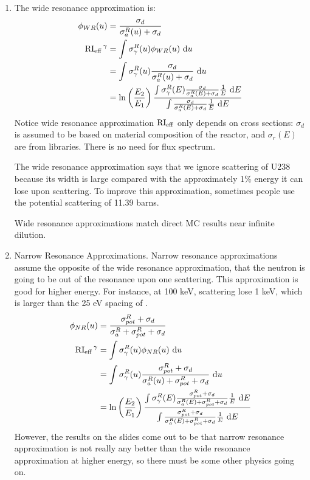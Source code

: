\documentclass{school-22.211-notes}
\date{February 27, 2012}
\begin{document}
\maketitle

\clearpage
{}
\begin{enumerate}
\item The wide resonance approximation is: 
\begin{align}
\phi_{WR} (u) &= \frac{\sigma_d}{\sigma_{a}^R (u) +  \sigma_d } \\
\left. \mathrm{RI}_{\mathrm{eff}} \right.^{\gamma} &= \int \sigma_{\gamma}^R (u) \phi_{WR} (u) \mbox{ }\mathrm{d} u \\
&= \int \sigma_{\gamma}^R (u) \frac{\sigma_d}{\sigma_a^R(u) + \sigma_d} \mbox{ }\mathrm{d} u \\
&= \ln\left( \frac{E_2}{E_1} \right) \frac{ \int \sigma_{\gamma}^R (E) \frac{\sigma_d}{\sigma_{a}^R(E) + \sigma_d} \frac{1}{E} \mbox{ }\mathrm{d} E}{ \int \frac{\sigma_d}{\sigma_{a}^R(E) + \sigma_d} \frac{1}{E} \mbox{ }\mathrm{d} E}
\end{align}
Notice wide resonance approximation $\mathrm{RI}_{\mathrm{eff}}$ only depends on cross sections: $\sigma_d$ is assumed to be based on material composition of the reactor, and $\sigma_r(E)$ are from libraries. There is no need for flux spectrum. 

The wide resonance approximation says that we ignore scattering of U238 because its width is large compared with the approximately 1\% energy it can lose upon scattering. To improve this approximation, sometimes people use the potential scattering of 11.39 barns. 

Wide resonance approximations match direct MC results near infinite dilution. 

\item Narrow Resonance Approximations. Narrow resonance approximations assume the opposite of the wide resonance approximation, that the neutron is going to be out of the resonance upon one scattering. This approximation is good for higher energy. For instance, at 100 keV, scattering lose 1 keV, which is larger than the 25 eV spacing of . 
\begin{align}
\phi_{NR} (u) &= \frac{\sigma_{pot}^R + \sigma_d}{\sigma_{a}^R + \sigma_{pot}^R + \sigma_d } \\
\left. \mathrm{RI}_{\mathrm{eff}} \right.^{\gamma} &= \int \sigma_{\gamma}^R (u) \phi_{NR} (u) \mbox{ }\mathrm{d} u \\
&= \int \sigma_{\gamma}^R (u) \frac{\sigma_{pot}^R + \sigma_d}{\sigma_a^R(u) + \sigma_{pot}^R + \sigma_d} \mbox{ }\mathrm{d} u \\
&= \ln\left( \frac{E_2}{E_1} \right) \frac{ \int \sigma_{\gamma}^R (E) \frac{\sigma_{pot}^R + \sigma_d}{\sigma_{a}^R(E) + \sigma_{pot}^R + \sigma_d} \frac{1}{E} \mbox{ }\mathrm{d} E}{ \int \frac{\sigma_{pot}^R + \sigma_d}{\sigma_{a}^R(E) + \sigma_{pot}^R + \sigma_d} \frac{1}{E} \mbox{ }\mathrm{d} E}
\end{align}
However, the results on the slides come out to be that narrow resonance approximation is not really any better than the wide resonance approximation at higher energy, so there must be some other physics going on. 


\end{enumerate}
\end{document}
